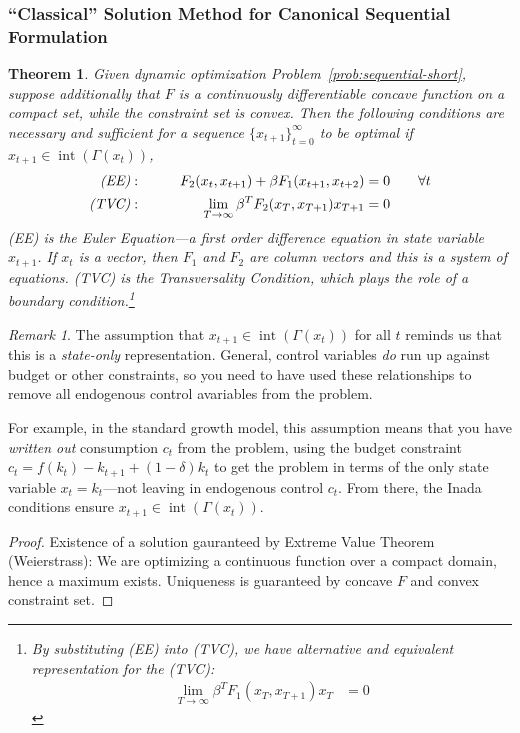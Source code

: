 \documentclass[12pt]{article}
\numberwithin{equation}{section} %
\theoremstyle{plain}
\newtheorem{thm}{Theorem}[section]
\theoremstyle{definition}
\theoremstyle{remark}
\newtheorem*{rmk}{Remark}
\newcommand{\ra}{\rightarrow}
\newcommand{\interior}{\operatorname{int}}
\newcommand{\tinfz}{_{t=0}^\infty}
\begin{document}
\clearpage
\subsubsection{``Classical'' Solution Method for Canonical Sequential
Formulation}

\begin{thm}
Given dynamic optimization Problem~\ref{prob:sequential-short}, suppose
additionally that $F$ is a continuously differentiable concave function
on a compact set, while the constraint set is convex. Then the following
conditions are necessary and sufficient for a sequence
$\{x_{t+1}\}\tinfz$ to be optimal if
$x_{t+1}\in \interior(\Gamma(x_t))$,
\begin{alignat*}{3}
  \text{\emph{(EE)}}:&&
  \qquad
  F_2(x_{t},x_{t+1}) + \beta F_1(x_{t+1},x_{t+2})
  &= 0
  \qquad\forall t
  \\
  \text{\emph{(TVC)}}:&&
  \lim_{T\ra\infty}
  \beta^T F_2(x_{T},x_{T+1})
  x_{T+1}
  &= 0
\end{alignat*}
(EE) is the Euler Equation---a first order difference equation in state
variable $x_{t+1}$. If $x_t$ is a vector, then $F_1$ and $F_2$ are
column vectors and this is a system of equations.
(TVC) is the \emph{Transversality Condition}, which plays the role of a
boundary condition.\footnote{%
  By substituting (EE) into (TVC), we have alternative
  and equivalent representation for the (TVC):
  \begin{align*}
    \lim_{T\ra\infty}
    \beta^{T}
    F_1(x_{T},x_{T+1})
    x_{T}
    &= 0
  \end{align*}
}
\end{thm}
\begin{rmk}
The assumption that $x_{t+1}\in\interior(\Gamma(x_t))$ for all $t$
reminds us that this is a \emph{state-only} representation.
General, control variables \emph{do} run up against budget or other
constraints, so you need to have used these relationships to remove
all endogenous control avariables from the problem.

For example, in the standard growth model, this assumption
means that you have \emph{written out} consumption $c_t$ from the
problem, using the budget constraint $c_t = f(k_t) - k_{t+1} +
(1-\delta) k_t$ to get the problem in terms of the only state variable
$x_t=k_t$---not leaving in endogenous control $c_t$.  From there, the
Inada conditions ensure $x_{t+1}\in \interior(\Gamma(x_t))$.
\end{rmk}
\begin{proof}
Existence of a solution gauranteed by Extreme Value Theorem
(Weierstrass): We are optimizing a continuous function over a compact
domain, hence a maximum exists. Uniqueness is guaranteed by concave $F$
and convex constraint set.
\end{proof}
\end{document}
